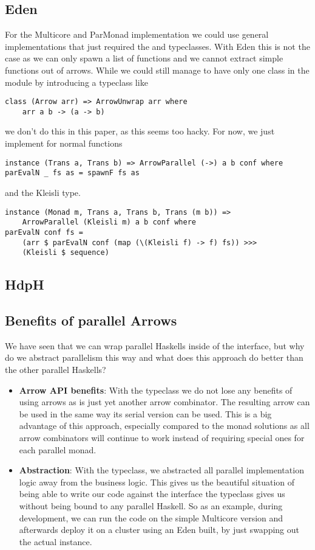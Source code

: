 \subsection{Eden}
For the Multicore and ParMonad implementation we could use general implementations that just required the  and  typeclasses. With Eden this is not the case as we can only spawn a list of functions and we cannot extract simple functions out of arrows. While we could still manage to have only one class in the module by introducing a typeclass like
\begin{lstlisting}[frame=htrbl]
class (Arrow arr) => ArrowUnwrap arr where
	arr a b -> (a -> b)
\end{lstlisting}
we don't do this in this paper, as this seems too hacky. For now, we just implement  for normal functions
\begin{lstlisting}[frame=htrbl]
instance (Trans a, Trans b) => ArrowParallel (->) a b conf where
parEvalN _ fs as = spawnF fs as
\end{lstlisting}
and the Kleisli type.
\begin{lstlisting}[frame=htrbl]
instance (Monad m, Trans a, Trans b, Trans (m b)) =>
	ArrowParallel (Kleisli m) a b conf where
parEvalN conf fs =
	(arr $ parEvalN conf (map (\(Kleisli f) -> f) fs)) >>>
	(Kleisli $ sequence)
\end{lstlisting}

\subsection{HdpH}

\subsection{Benefits of parallel Arrows}
We have seen that we can wrap parallel Haskells inside of the  interface, but why do we abstract parallelism this way and what does this approach do better than the other parallel Haskells?
\begin{itemize}
	\item \textbf{Arrow API benefits}:
	With the  typeclass we do not lose any benefits of using arrows as  is just yet another arrow combinator. The resulting arrow can be used in the same way its serial version can be used. This is a big advantage of this approach, especially compared to the monad solutions as all arrow combinators will continue to work instead of requiring special ones for each parallel monad.
	\item \textbf{Abstraction}:
	With the  typeclass, we abstracted all parallel implementation logic away from the business logic. This gives us the beautiful situation of being able to write our code against the interface the typeclass gives us without being bound to any parallel Haskell. So as an example, during development, we can run the code on the simple Multicore version and afterwards deploy it on a cluster using an Eden built, by just swapping out the actual  instance.
\end{itemize}
